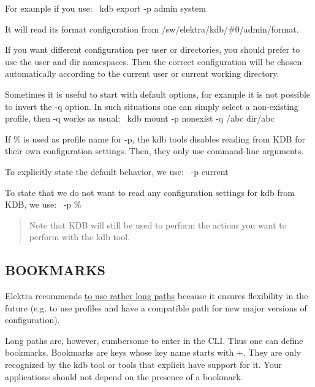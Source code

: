 For example if you use\+:~\newline
 {\ttfamily kdb export -\/p admin system}

It will read its format configuration from {\ttfamily /sw/elektra/kdb/\#0/admin/format}.

If you want different configuration per user or directories, you should prefer to use the {\ttfamily user} and {\ttfamily dir} namespaces. Then the correct configuration will be chosen automatically according to the current user or current working directory.

Sometimes it is useful to start with default options, for example it is not possible to invert the {\ttfamily -\/q} option. In such situations one can simply select a non-\/existing profile, then {\ttfamily -\/q} works as usual\+:~\newline
 {\ttfamily kdb mount -\/p nonexist -\/q /abc dir/abc}

If {\ttfamily \%} is used as profile name for {\ttfamily -\/p}, the {\ttfamily kdb} tools disables reading from {\ttfamily K\+DB} for their own configuration settings. Then, they only use command-\/line arguments.

To explicitly state the default behavior, we use\+:~\newline
 {\ttfamily -\/p current}

To state that we do not want to read any configuration settings for {\ttfamily kdb} from K\+DB, we use\+:~\newline
 {\ttfamily -\/p \%}

\begin{quote}
Note that K\+DB will still be used to perform the actions you want to perform with the {\ttfamily kdb} tool. \end{quote}


\subsection*{B\+O\+O\+K\+M\+A\+R\+KS}

Elektra recommends \hyperlink{doc_tutorials_application-integration_md}{to use rather long paths} because it ensures flexibility in the future (e.\+g. to use profiles and have a compatible path for new major versions of configuration).

Long paths are, however, cumbersome to enter in the C\+LI. Thus one can define bookmarks. Bookmarks are keys whose key name starts with {\ttfamily +}. They are only recognized by the {\ttfamily kdb} tool or tools that explicit have support for it. Your applications should not depend on the presence of a bookmark.

